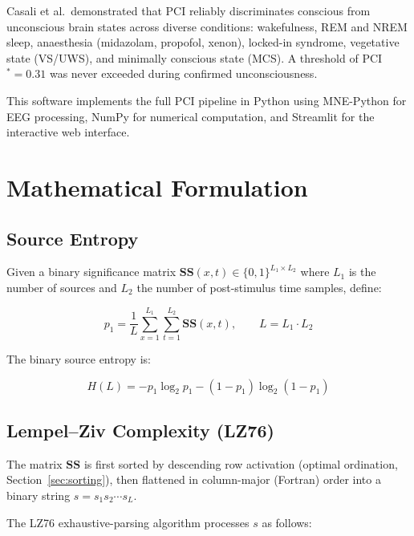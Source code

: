 \documentclass[11pt,a4paper]{article}
\begin{document}
Casali et al.\ demonstrated that PCI reliably discriminates conscious from unconscious brain
states across diverse conditions: wakefulness, REM and NREM sleep, anaesthesia (midazolam,
propofol, xenon), locked-in syndrome, vegetative state (VS/UWS), and minimally conscious
state (MCS). A threshold of PCI$^* = 0.31$ was never exceeded during confirmed unconsciousness.

This software implements the full PCI pipeline in Python using MNE-Python for EEG processing,
NumPy for numerical computation, and Streamlit for the interactive web interface.

\section{Mathematical Formulation}
\label{sec:math}

\subsection{Source Entropy}

Given a binary significance matrix $\mathbf{SS}(x, t) \in \{0, 1\}^{L_1 \times L_2}$ where
$L_1$ is the number of sources and $L_2$ the number of post-stimulus time samples, define:

\begin{equation}
  p_1 = \frac{1}{L} \sum_{x=1}^{L_1} \sum_{t=1}^{L_2} \mathbf{SS}(x, t),
  \qquad L = L_1 \cdot L_2
  \label{eq:p1}
\end{equation}

The binary source entropy is:

\begin{equation}
  H(L) = -p_1 \log_2 p_1 - (1 - p_1) \log_2 (1 - p_1)
  \label{eq:entropy}
\end{equation}

\subsection{Lempel--Ziv Complexity (LZ76)}

The matrix $\mathbf{SS}$ is first sorted by descending row activation (optimal ordination,
Section~\ref{sec:sorting}), then flattened in column-major (Fortran) order into a binary
string $s = s_1 s_2 \cdots s_L$.

The LZ76 exhaustive-parsing algorithm \cite{lempel1976,kaspar1987} processes $s$ as follows:
\end{document}
